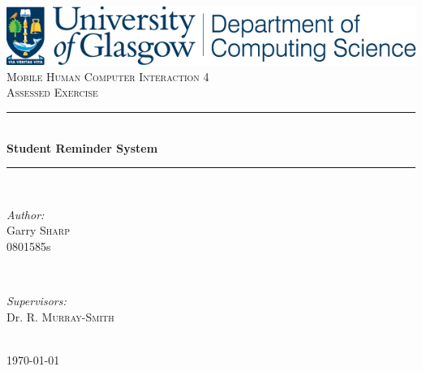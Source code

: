 \documentclass[12pt]{article} %
\begin{document}

\begin{titlepage}

\newcommand{\HRule}{\rule{\linewidth}{0.5mm}} %
\center %
\includegraphics[width=\textwidth]{Glasgow}\\[1.5cm]
\textsc{\LARGE Mobile Human Computer Interaction 4}\\[0.5cm] %
\textsc{\Large Assessed Exercise}\\[0.5cm] %

\HRule \\[0.4cm]
{ \huge \bfseries Student Reminder System}\\[0.4cm] %
\HRule \\[1.5cm]

\begin{minipage}{0.4\textwidth}
\begin{flushleft} \large
\emph{Author:}\\
Garry \textsc{Sharp}\\
0801585s\\ %
\end{flushleft}
\end{minipage}
~
\begin{minipage}{0.4\textwidth}
\begin{flushright} \large
\emph{Supervisors:} \\
Dr. R. \textsc{Murray-Smith}\\ %
\end{flushright}
\end{minipage}\\[4cm]

{\large \today}\\[3cm] %

\vfill %

\end{titlepage}
\end{document}
